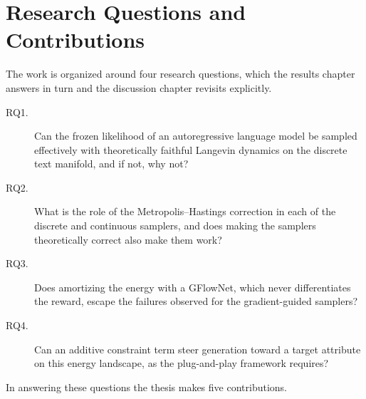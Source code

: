 %
%

\section{Research Questions and Contributions}
\label{sec:intro-rqs}

The work is organized around four research questions, which the results chapter answers in turn and the discussion chapter revisits explicitly.

\begin{description}
    \item[RQ1.] Can the frozen likelihood of an autoregressive language model be sampled effectively with theoretically faithful Langevin dynamics on the discrete text manifold, and if not, why not?
    \item[RQ2.] What is the role of the Metropolis--Hastings correction in each of the discrete and continuous samplers, and does making the samplers theoretically correct also make them work?
    \item[RQ3.] Does amortizing the energy with a GFlowNet, which never differentiates the reward, escape the failures observed for the gradient-guided samplers?
    \item[RQ4.] Can an additive constraint term steer generation toward a target attribute on this energy landscape, as the plug-and-play framework requires?
\end{description}

In answering these questions the thesis makes five contributions.

